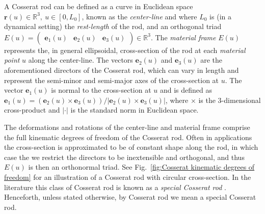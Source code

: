 A Cosserat rod can be defined as a curve in Euclidean space $\mathbf{r}(u) \in \mathbb{R}^3,\ u \in [0, L_0]$, known as the \textit{center-line} and where $L_0$ is (in a dynamical setting) the \textit{rest-length} of the rod, and an orthogonal triad $E(u) = \begin{pmatrix} \mathbf{e}_1(u) & \mathbf{e}_2(u) & \mathbf{e}_3(u) \end{pmatrix} \in \mathbb{R}^3$. The \textit{material frame} $E(u)$ represents the, in general ellipsoidal, cross-section of the rod at each \textit{material point} $u$ along the center-line. The vectors $\mathbf{e}_2(u)$ and $\mathbf{e}_3(u)$ are the aforementioned directors of the Cosserat rod, which can vary in length and represent the semi-minor and semi-major axes of the cross-section at $u$. The vector $\mathbf{e}_1(u)$ is normal to the cross-section at $u$ and is defined as $\mathbf{e}_1(u) = (\mathbf{e}_2(u) \times \mathbf{e}_3(u)) / |\mathbf{e}_2(u) \times \mathbf{e}_3(u)|$, where $\times$ is the 3-dimensional cross-product and $|\cdot|$ is the standard norm in Euclidean space.

The deformations and rotations of the center-line and material frame comprise the full kinematic degrees of freedom of the Cosserat rod. Often in applications the cross-section is approximated to be of constant shape along the rod, in which case the we restrict the directors to be inextensible and orthogonal, and thus $E(u)$ is then an orthonormal triad. See Fig.~\ref{fig:Cosserat kinematic degrees of freedom} for an illustration of a Cosserat rod with circular cross-section. In the literature this class of Cosserat rod is known as a \textit{special Cosserat rod} \citep{antmanSpecialCosseratTheory1995, rubinCosseratRods2000, altenbachCosseratMedia2013}. Henceforth, unless stated otherwise, by Cosserat rod we mean a special Cosserat rod.

